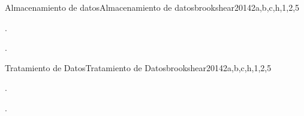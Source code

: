 \begin{syllabus}
\begin{unit}{Almacenamiento de datos}{Almacenamiento de datos}{brookshear2014}{2}{a,b,c,h,1,2,5}
   \begin{topics}
      \item \DSBasicLogicTopicPropositional
      \item \DSBasicLogicTopicLogical
      \item \DSBasicLogicTopicTruth
      \item \DSBasicLogicTopicNormal
      \item \ARMachinelevelrepresentationofdataTopicBits
      \item \ARMachinelevelrepresentationofdataTopicNumeric
   \end{topics}
   \begin{learningoutcomes}
      \item \DSBasicLogicLOConvertLogical[\Familiarity]
      \item \DSBasicLogicLOApplyFormal [\Familiarity]
      \item \ARMachinelevelrepresentationofdataLOExplainWhyData [\Familiarity].
      \item \ARMachinelevelrepresentationofdataLOExplainTheUsing [\Familiarity].
   \end{learningoutcomes}
\end{unit}
\begin{unit}{Tratamiento de Datos}{Tratamiento de Datos}{brookshear2014}{2}{a,b,c,h,1,2,5}
   \begin{topics}
     \item \ARDigitallogicanddigitalsystemsTopicOverview
     \item \ARAssemblylevelmachineorganizationTopicBasic
     \item \ARAssemblylevelmachineorganizationTopicControl
     \item \ARAssemblylevelmachineorganizationTopicInstruction
     \item \ARAssemblylevelmachineorganizationTopicAssembly
     \item \ARMemorysystemorganizationandarchitectureTopicMain
   \end{topics}
   \begin{learningoutcomes}
      \item \DSBasicLogicLOConvertLogical[\Familiarity]
      \item \DSBasicLogicLOApplyFormal [\Familiarity]
      \item \ARAssemblylevelmachineorganizationLOExplainTheTheNeumann [\Familiarity].
      \item \ARAssemblylevelmachineorganizationLODescribeHowIs [\Familiarity].
   \end{learningoutcomes}
\end{unit}


\end{syllabus}
